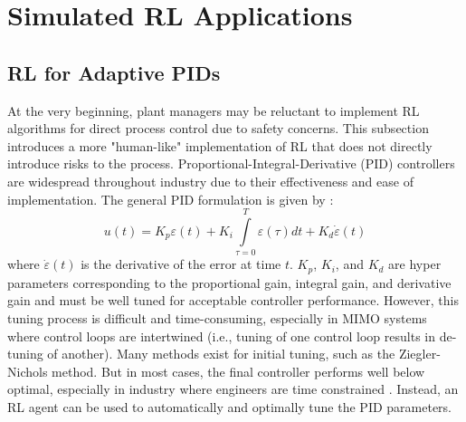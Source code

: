 \section{Simulated RL Applications}
\subsection{RL for Adaptive PIDs}
At the very beginning, plant managers may be reluctant to implement RL algorithms for direct process control due to safety concerns.  This subsection introduces a more "human-like" implementation of RL that does not directly introduce risks to the process.  Proportional-Integral-Derivative (PID) controllers are widespread throughout industry due to their effectiveness and ease of implementation. The general PID formulation is given by \cite{process_control_ref13}:
\begin{equation}
    u(t) = K_p \varepsilon(t) + K_i \int\limits_{\tau = 0}^T \varepsilon(\tau)dt + K_d\dot{\varepsilon}(t)
\end{equation}
where $\dot{\varepsilon}(t)$ is the derivative of the error at time $t$. $K_p$, $K_i$, and $K_d$ are hyper parameters corresponding to the proportional gain, integral gain, and derivative gain and must be well tuned for acceptable controller performance. However, this tuning process is difficult and time-consuming, especially in MIMO systems where control loops are intertwined (i.e., tuning of one control loop results in de-tuning of another).  Many methods exist for initial tuning, such as the Ziegler-Nichols method. But in most cases, the final controller performs well below optimal, especially in industry where engineers are time constrained \cite{pid1}.  Instead, an RL agent can be used to automatically and optimally tune the PID parameters.


